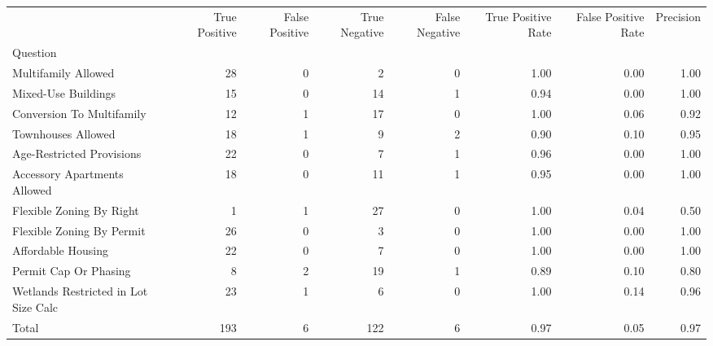 \begin{tabular}{lrrrrrrr}
\toprule
{} &  True Positive &  False Positive &  True Negative &  False Negative &  True Positive Rate &  False Positive Rate &  Precision \\
Question                             &                &                 &                &                 &                     &                      &            \\
\midrule
Multifamily Allowed                  &             28 &               0 &              2 &               0 &                1.00 &                 0.00 &       1.00 \\
Mixed-Use Buildings                  &             15 &               0 &             14 &               1 &                0.94 &                 0.00 &       1.00 \\
Conversion To Multifamily            &             12 &               1 &             17 &               0 &                1.00 &                 0.06 &       0.92 \\
Townhouses Allowed                   &             18 &               1 &              9 &               2 &                0.90 &                 0.10 &       0.95 \\
Age-Restricted Provisions            &             22 &               0 &              7 &               1 &                0.96 &                 0.00 &       1.00 \\
Accessory Apartments Allowed         &             18 &               0 &             11 &               1 &                0.95 &                 0.00 &       1.00 \\
Flexible Zoning By Right             &              1 &               1 &             27 &               0 &                1.00 &                 0.04 &       0.50 \\
Flexible Zoning By Permit            &             26 &               0 &              3 &               0 &                1.00 &                 0.00 &       1.00 \\
Affordable Housing                   &             22 &               0 &              7 &               0 &                1.00 &                 0.00 &       1.00 \\
Permit Cap Or Phasing                &              8 &               2 &             19 &               1 &                0.89 &                 0.10 &       0.80 \\
Wetlands Restricted in Lot Size Calc &             23 &               1 &              6 &               0 &                1.00 &                 0.14 &       0.96 \\
Total                                &            193 &               6 &            122 &               6 &                0.97 &                 0.05 &       0.97 \\
\bottomrule
\end{tabular}
